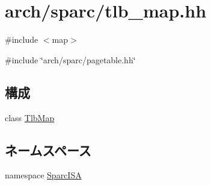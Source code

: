 \hypertarget{tlb__map_8hh}{
\section{arch/sparc/tlb\_\-map.hh}
\label{tlb__map_8hh}
}
{\ttfamily \#include $<$map$>$}\par
{\ttfamily \#include \char`\"{}arch/sparc/pagetable.hh\char`\"{}}\par
\subsection*{構成}
\begin{DoxyCompactItemize}
\item 
class \hyperlink{classSparcISA_1_1TlbMap}{TlbMap}
\end{DoxyCompactItemize}
\subsection*{ネームスペース}
\begin{DoxyCompactItemize}
\item 
namespace \hyperlink{namespaceSparcISA}{SparcISA}
\end{DoxyCompactItemize}
